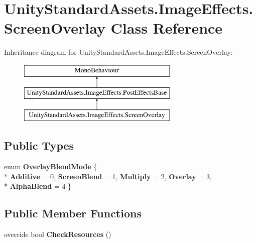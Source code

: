 \hypertarget{class_unity_standard_assets_1_1_image_effects_1_1_screen_overlay}{}\section{Unity\+Standard\+Assets.\+Image\+Effects.\+Screen\+Overlay Class Reference}
\label{class_unity_standard_assets_1_1_image_effects_1_1_screen_overlay}
Inheritance diagram for Unity\+Standard\+Assets.\+Image\+Effects.\+Screen\+Overlay\+:\begin{figure}[H]
\begin{center}
\leavevmode
\includegraphics[height=3.000000cm]{class_unity_standard_assets_1_1_image_effects_1_1_screen_overlay}
\end{center}
\end{figure}
\subsection*{Public Types}
\begin{DoxyCompactItemize}
\item 
enum {\bfseries Overlay\+Blend\+Mode} \{ \\*
{\bfseries Additive} = 0, 
{\bfseries Screen\+Blend} = 1, 
{\bfseries Multiply} = 2, 
{\bfseries Overlay} = 3, 
\\*
{\bfseries Alpha\+Blend} = 4
 \}\hypertarget{class_unity_standard_assets_1_1_image_effects_1_1_screen_overlay_a30569b65d427b6bed92c74463682cb00}{}\label{class_unity_standard_assets_1_1_image_effects_1_1_screen_overlay_a30569b65d427b6bed92c74463682cb00}

\end{DoxyCompactItemize}
\subsection*{Public Member Functions}
\begin{DoxyCompactItemize}
\item 
override bool {\bfseries Check\+Resources} ()\hypertarget{class_unity_standard_assets_1_1_image_effects_1_1_screen_overlay_ad0235de5f915871090fa5789c43242a8}{}\label{class_unity_standard_assets_1_1_image_effects_1_1_screen_overlay_ad0235de5f915871090fa5789c43242a8}

\end{DoxyCompactItemize}
